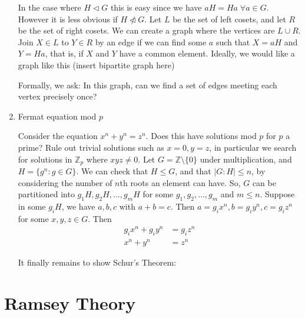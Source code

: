 \documentclass{article}
\begin{document}
\begin{eg}
\begin{enumerate}[label=\arabic*.]
            In the case where $H \lhd G$ this is easy since we have $a H = H a \; \forall a \in G$.  However it is less obvious if $H \ntriangleleft G$.
            Let $L$ be the set of left cosets, and let $R$ be the set of right cosets. We can create a graph where the vertices are $L \cup R$.
            Join $X \in L$ to $Y \in R$ by an edge if we can find some $a$ such that $X = aH$ and $Y = Ha$, that is, if $X$ and $Y$ have a common element.  Ideally, we would like a graph like this
            (insert bipartite graph here)

            Formally, we ask: In this graph, can we find a set of edges meeting each vertex precisely once?

        \item Fermat equation mod $p$

            Consider the equation $x^n + y^n = z^n$. Does this have solutions mod $p$ for $p$ a prime?  Rule out trivial solutions such as $x = 0, y = z$, in particular we search for solutions in $\mathbb{Z}_p$ where $xyz \ne 0$.
            Let $G = \mathbb{Z} \setminus \{0\}$ under multiplication, and $H = \{g^n : g \in G\}$.  We can check that $H \leq G$, and that $|G : H| \leq n$, by considering the number of $n$th roots an element can have.
            So, $G$ can be partitioned into $g_1 H, g_2 H, \dots, g_mH$ for some $g_1, g_2, \dots, g_m$ and $m \leq n$.  Suppose in some $g_i H$, we have $a, b, c$ with $a + b = c$.  Then $a = g_i x^n, b = g_i y^n, c = g_i z^n$ for some $x, y, z \in G$.  Then
            \begin{align*}
              g_i x^n + g_i y^n &= g_i z^n \\
              x^n + y^n &= z^n
            \end{align*}

            It finally remains to show Schur's Theorem:

    \end{enumerate}
\end{eg}

\clearpage
\section{Ramsey Theory}
\end{document}
